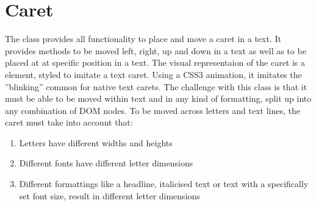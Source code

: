 


\section{Caret}
\label{subsec:caret}

The  class provides all functionality to place and move a caret in a text. It provides methods to be moved left, right, up and down in a text as well as to be placed at at specific position in a text. The visual representaion of the caret is a  element, styled to imitate a text caret. Using a CSS3 animation, it imitates the ''blinking'' common for native text carets. The challenge with this class is that it must be able to be moved within text and in any kind of formatting, split up into any combination of DOM nodes. To be moved across letters and text lines, the caret must take into account that:

\begin{enumerate}
\item Letters have different widths and heights
\item Different fonts have different letter dimensions
\item Different formattings like a headline, italicised text or text with a specifically set font size, result in different letter dimensions
\end{enumerate}

